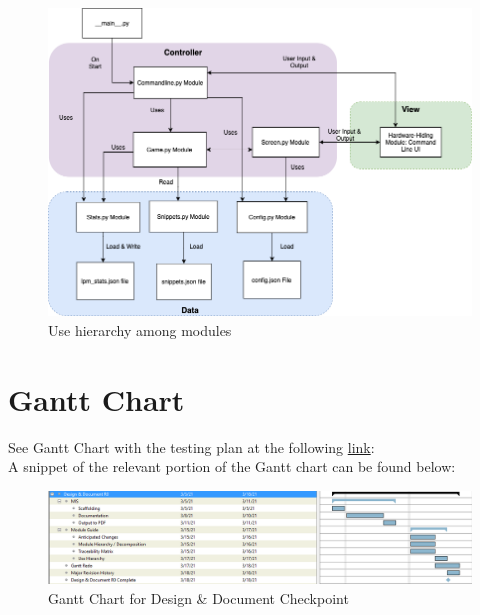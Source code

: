 \documentclass[12pt, titlepage]{article}
\begin{document}
\begin{figure}[!htbp]
\centering
\includegraphics[scale=0.5]{3xa3_archdiagram.png}
\caption{Use hierarchy among modules}
\label{FigUH}
\end{figure}

\section{Gantt Chart}

See Gantt Chart with the testing plan at the following \href{https://gitlab.cas.mcmaster.ca/modyj/3xa3/-/tree/master/ProjectSchedule}{link}: \\

A snippet of the relevant portion of the Gantt chart can be found below:
\begin{figure}[!htbp]
\centering
\includegraphics[scale=0.5]{MG_Gantt.png}
\caption{Gantt Chart for Design & Document Checkpoint}
\label{FigUH}
\end{figure}


\end{document}
